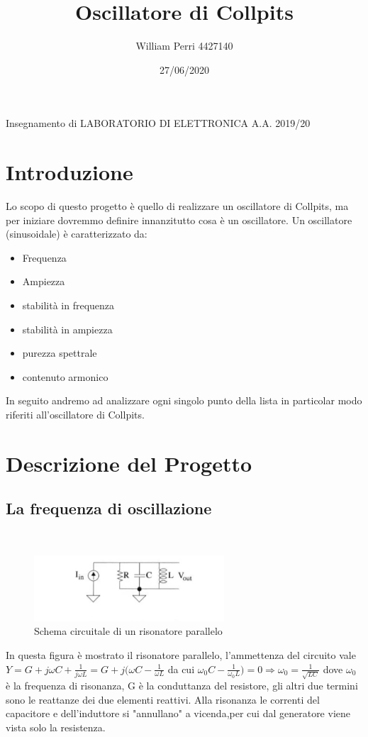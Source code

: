 \documentclass{article}
\title{Oscillatore di Collpits}
\author{William Perri 4427140 }
\date{27/06/2020}
\begin{document}
\maketitle
Insegnamento di LABORATORIO DI ELETTRONICA A.A. 2019/20

\newpage
\tableofcontents
\newpage
\section{Introduzione}
Lo scopo di questo progetto è quello di realizzare un oscillatore di Collpits, ma per iniziare dovremmo definire innanzitutto cosa è un oscillatore.
Un oscillatore (sinusoidale) è caratterizzato da:
\begin{itemize}
\item Frequenza
\item Ampiezza
\item stabilità in frequenza
\item stabilità in ampiezza
\item purezza spettrale
\item contenuto armonico
\end{itemize}
In seguito andremo ad analizzare ogni singolo punto della lista in particolar modo riferiti all'oscillatore di Collpits.
\newpage
\section{Descrizione del Progetto}
\subsection{La frequenza di oscillazione}
~\begin{figure}[H]
\includegraphics[scale=1]{RisonatoreParallelo.png} 
\caption{Schema circuitale di un risonatore parallelo}
\label{fig:foo}
\end{figure}
In questa figura è mostrato il risonatore parallelo, l'ammettenza del circuito vale 
$Y=G+j\omega C+\frac{1}{j\omega L}=G+j(\omega C-\frac{1}{\omega L}$ da cui $\omega_0C-\frac{1}{\omega _0L})=0 \Rightarrow \omega _0=\frac{1}{\sqrt{LC}}$ dove $\omega _0$ è la frequenza di risonanza, G è la conduttanza del resistore, gli altri due termini sono le reattanze dei due elementi reattivi.
Alla risonanza le correnti del capacitore e dell'induttore si "annullano" a vicenda,per cui dal generatore viene vista solo la resistenza. 
\end{document}
